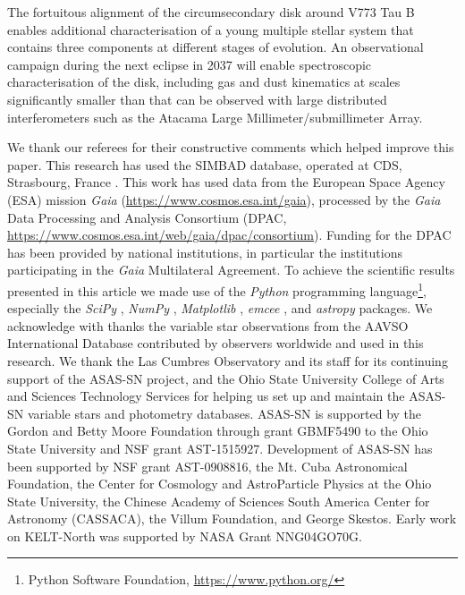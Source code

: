 \documentclass{aa}
\begin{document}
The fortuitous alignment of the circumsecondary disk around V773 Tau B enables additional characterisation of a young multiple stellar system that contains three components at different stages of evolution.
%
An observational campaign during the next eclipse in 2037 will enable spectroscopic characterisation of the disk, including gas and dust kinematics at scales significantly smaller than that can be observed with large distributed interferometers such as the Atacama Large Millimeter/submillimeter Array.

\begin{acknowledgements}

We thank our referees for their constructive comments which helped improve this paper.
%
This research has used the SIMBAD database, operated at CDS, Strasbourg, France \citep{wenger2000}.
%
This work has used data from the European Space Agency (ESA) mission {\it Gaia} (\url{https://www.cosmos.esa.int/gaia}), processed by the {\it Gaia} Data Processing and Analysis Consortium (DPAC, \url{https://www.cosmos.esa.int/web/gaia/dpac/consortium}).
%
Funding for the DPAC has been provided by national institutions, in particular the institutions participating in the {\it Gaia} Multilateral Agreement.
%
To achieve the scientific results presented in this article we made use of the \emph{Python} programming language\footnote{Python Software Foundation, \url{https://www.python.org/}}, especially the \emph{SciPy} \citep{virtanen2020}, \emph{NumPy} \citep{numpy}, \emph{Matplotlib} \citep{Matplotlib}, \emph{emcee} \citep{foreman-mackey2013}, and \emph{astropy} \citep{astropy_1,astropy_2} packages.
%
We acknowledge with thanks the variable star observations from the AAVSO International Database contributed by observers worldwide and used in this research.
%
We thank the Las Cumbres Observatory and its staff for its continuing support of the ASAS-SN project, and the Ohio State University College of Arts and Sciences Technology Services for helping us set up and maintain the ASAS-SN variable stars and photometry databases.
%
ASAS-SN is supported by the Gordon and Betty Moore Foundation through grant GBMF5490 to the Ohio State University and NSF grant AST-1515927.
%
Development of ASAS-SN has been supported by NSF grant AST-0908816, the Mt. Cuba Astronomical Foundation, the Center for Cosmology and AstroParticle Physics at the Ohio State University, the Chinese Academy of Sciences South America Center for Astronomy (CASSACA), the Villum Foundation, and George Skestos.
%
Early work on KELT-North was supported by NASA Grant NNG04GO70G.

\end{acknowledgements}
\end{document}
